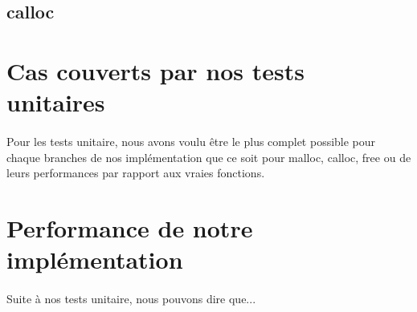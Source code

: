 \documentclass[10pt,a4paper]{article}
\begin{document}
\subsection{calloc}

\paragraph{}


\section{Cas couverts par nos tests unitaires}

\paragraph{}Pour les tests unitaire, nous avons voulu être le plus complet possible pour chaque branches de nos implémentation que ce soit pour malloc, calloc, free ou de leurs performances par rapport aux vraies fonctions.


\section{Performance de notre implémentation}

\paragraph{}Suite à nos tests unitaire, nous pouvons dire que...


\end{document}
